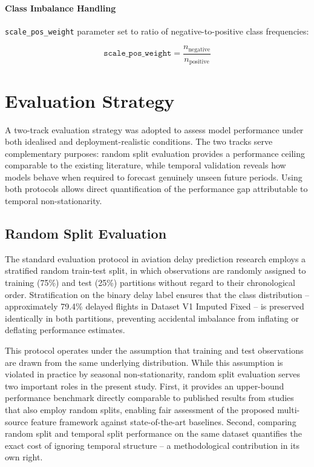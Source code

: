 \documentclass{report}
\begin{document}
\paragraph{Class Imbalance Handling}

\texttt{scale\_pos\_weight} parameter set to ratio of negative-to-positive class frequencies:

\begin{equation}
\texttt{scale\_pos\_weight} = \frac{n_{\text{negative}}}{n_{\text{positive}}}
\end{equation}


\section{Evaluation Strategy}
\label{sec:eval_strategy}

A two-track evaluation strategy was adopted to assess model performance under
both idealised and deployment-realistic conditions.  The two tracks serve
complementary purposes: random split evaluation provides a performance ceiling
comparable to the existing literature, while temporal validation reveals how
models behave when required to forecast genuinely unseen future periods.
Using both protocols allows direct quantification of the performance gap
attributable to temporal non-stationarity.

\subsection{Random Split Evaluation}

The standard evaluation protocol in aviation delay prediction research employs
a stratified random train-test split, in which observations are randomly
assigned to training (75\%) and test (25\%) partitions without regard to their
chronological order.  Stratification on the binary delay label ensures that
the class distribution -- approximately 79.4\% delayed flights in Dataset V1
Imputed Fixed -- is preserved identically in both partitions, preventing
accidental imbalance from inflating or deflating performance estimates.

This protocol operates under the assumption that training and test observations
are drawn from the same underlying distribution.  While this assumption is
violated in practice by seasonal non-stationarity, random split evaluation
serves two important roles in the present study.  First, it provides an
upper-bound performance benchmark directly comparable to published results
from studies that also employ random splits, enabling fair assessment of the
proposed multi-source feature framework against state-of-the-art baselines.
Second, comparing random split and temporal split performance on the same
dataset quantifies the exact cost of ignoring temporal structure -- a
methodological contribution in its own right.
\end{document}
